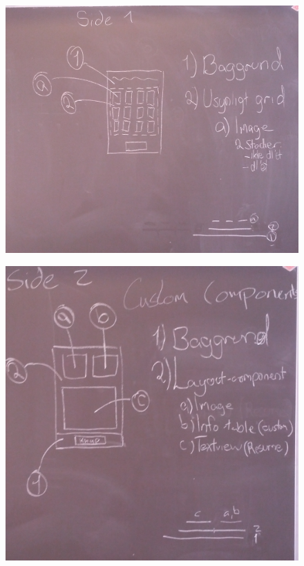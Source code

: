 \message{ !name(Rapport.tex)}\documentclass[12pt]{article}
\begin{document}
\begin{figure}
\includegraphics[scale=0.2]{Tavle1}
\caption{ }
\label{Table1}
\end{figure}
\begin{figure}
\includegraphics[scale=0.2]{Tavle3}
\caption{ }
\label{Table3}
\end{figure}
\end{document}
